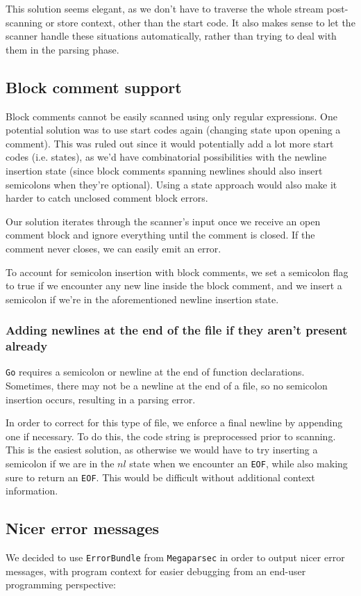 \documentclass[11pt]{article}
\begin{document}
This solution seems elegant, as we don't have to traverse
the whole stream post-scanning or store context, other than the
start code. It also makes sense to let the scanner handle these
situations automatically, rather than trying to deal with them
in the parsing phase.
\subsection{Block comment support}
\label{sec:orgb87d6b8}
Block comments cannot be easily scanned using only regular
expressions. One potential solution was to use start codes again
(changing state upon opening a comment). This was ruled out since
it would potentially add a lot more start codes (i.e. states), as
we'd have combinatorial possibilities with the newline insertion state
(since block comments spanning newlines should also insert semicolons
when they're optional). Using a state approach would also make it
harder to catch unclosed comment block errors.

Our solution iterates through the scanner's input once we receive an
open comment block and ignore everything until the comment is closed.
If the comment never closes, we can easily emit an error.

To account for semicolon insertion with block comments, we set a
semicolon flag to true if we encounter any new line inside the
block comment, and we insert a semicolon if we're in the
aforementioned newline insertion state.
\subsubsection{Adding newlines at the end of the file if they aren't present already}
\label{sec:org7df6806}
\texttt{Go} requires a semicolon or newline at the end of function
declarations. Sometimes, there may not be a newline at the end of
a file, so no semicolon insertion occurs, resulting in a parsing error.

In order to correct for this type of file, we enforce a final
newline by appending one if necessary. To do this, the code string
is preprocessed prior to scanning. This is the easiest solution,
as otherwise we would have to try inserting a semicolon if we are in
the \(nl\) state when we encounter an \texttt{EOF}, while also making sure
to return an \texttt{EOF}. This would be difficult without additional
context information.
\subsection{Nicer error messages}
\label{sec:org7ebc86d}
We decided to use \texttt{ErrorBundle} from \texttt{Megaparsec} in order to
output nicer error messages, with program context for easier
debugging from an end-user programming perspective:
\end{document}
